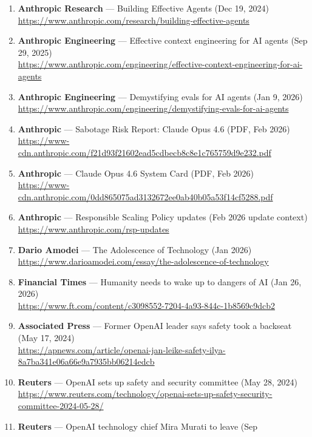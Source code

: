 \documentclass[11pt]{article}
\begin{document}
\begin{enumerate}
\item
  \textbf{Anthropic Research} --- Building Effective Agents (Dec 19,
  2024)\\
  \url{https://www.anthropic.com/research/building-effective-agents}
\item
  \textbf{Anthropic Engineering} --- Effective context engineering for
  AI agents (Sep 29, 2025)\\
  \url{https://www.anthropic.com/engineering/effective-context-engineering-for-ai-agents}
\item
  \textbf{Anthropic Engineering} --- Demystifying evals for AI agents
  (Jan 9, 2026)\\
  \url{https://www.anthropic.com/engineering/demystifying-evals-for-ai-agents}
\item
  \textbf{Anthropic} --- Sabotage Risk Report: Claude Opus 4.6 (PDF, Feb
  2026)\\
  \url{https://www-cdn.anthropic.com/f21d93f21602ead5cdbecb8c8e1c765759d9e232.pdf}
\item
  \textbf{Anthropic} --- Claude Opus 4.6 System Card (PDF, Feb 2026)\\
  \url{https://www-cdn.anthropic.com/0dd865075ad3132672ee0ab40b05a53f14cf5288.pdf}
\item
  \textbf{Anthropic} --- Responsible Scaling Policy updates (Feb 2026
  update context)\\
  \url{https://www.anthropic.com/rsp-updates}
\item
  \textbf{Dario Amodei} --- The Adolescence of Technology (Jan 2026)\\
  \url{https://www.darioamodei.com/essay/the-adolescence-of-technology}
\item
  \textbf{Financial Times} --- Humanity needs to wake up to dangers of
  AI (Jan 26, 2026)\\
  \url{https://www.ft.com/content/c3098552-7204-4a93-844c-1b8569c9dcb2}
\item
  \textbf{Associated Press} --- Former OpenAI leader says safety took a
  backseat (May 17, 2024)\\
  \url{https://apnews.com/article/openai-jan-leike-safety-ilya-8a7ba341e06a66e9a7935bb06214edcb}
\item
  \textbf{Reuters} --- OpenAI sets up safety and security committee (May
  28, 2024)\\
  \url{https://www.reuters.com/technology/openai-sets-up-safety-security-committee-2024-05-28/}
\item
  \textbf{Reuters} --- OpenAI technology chief Mira Murati to leave (Sep

\end{enumerate}
\end{document}

